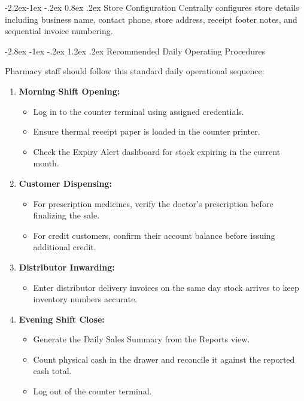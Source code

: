 \documentclass[11pt,a4paper]{article}
\makeatletter
\renewcommand\section{\@startsection {section}{1}{\z@}%
                                   {-2.8ex \@plus -1ex \@minus -.2ex}%
                                   {1.2ex \@plus.2ex}%
                                   {\normalfont\Large\bfseries\color{HeaderNavy}}}
\renewcommand\subsection{\@startsection{subsection}{2}{\z@}%
                                     {-2.2ex\@plus -1ex \@minus -.2ex}%
                                     {0.8ex \@plus .2ex}%
                                     {\normalfont\large\bfseries\color{SubHeader}}}
\makeatother
\begin{document}
\subsection{Store Configuration}
Centrally configures store details including business name, contact phone, store address, receipt footer notes, and sequential invoice numbering.

\section{Recommended Daily Operating Procedures}

Pharmacy staff should follow this standard daily operational sequence:

\begin{enumerate}
    \item \textbf{Morning Shift Opening:}
    \begin{itemize}
        \item Log in to the counter terminal using assigned credentials.
        \item Ensure thermal receipt paper is loaded in the counter printer.
        \item Check the Expiry Alert dashboard for stock expiring in the current month.
    \end{itemize}
    \item \textbf{Customer Dispensing:}
    \begin{itemize}
        \item For prescription medicines, verify the doctor's prescription before finalizing the sale.
        \item For credit customers, confirm their account balance before issuing additional credit.
    \end{itemize}
    \item \textbf{Distributor Inwarding:}
    \begin{itemize}
        \item Enter distributor delivery invoices on the same day stock arrives to keep inventory numbers accurate.
    \end{itemize}
    \item \textbf{Evening Shift Close:}
    \begin{itemize}
        \item Generate the Daily Sales Summary from the Reports view.
        \item Count physical cash in the drawer and reconcile it against the reported cash total.
        \item Log out of the counter terminal.
    \end{itemize}
\end{enumerate}
\end{document}
